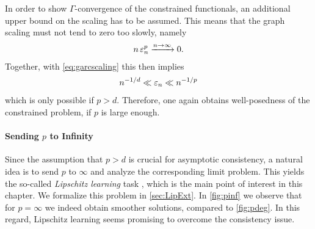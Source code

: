 %
%
In order to show $\Gamma$-convergence of the constrained functionals, an additional upper bound on the scaling has to be assumed. This means that the graph scaling must not tend to zero too slowly, namely
%
\begin{align*}
n\, \varepsilon_n^p \xrightarrow{n\to\infty} 0.	
\end{align*}
%
Together, with \cref{eq:garcscaling} this then implies
%
\begin{align*}
n^{-1/d} \ll \varepsilon_n \ll n^{-1/p}
\end{align*}
%
which is only possible if $p>d$. Therefore, one again obtains well-posedness of the constrained problem, if $p$ is large enough.


\paragraph{Sending $p$ to Infinity} 

Since the assumption that $p>d$ is crucial for asymptotic consistency, a natural idea is to send $p$ to $\infty$ and analyze the corresponding limit problem. This yields the so-called \emph{Lipschitz learning} task \cite{von2004distance, kyng2015algorithms}, which is the main point of interest in this chapter. We formalize this problem in \cref{sec:LipExt}. In \cref{fig:pinf} we observe that for $p=\infty$ we indeed obtain smoother solutions, compared to \cref{fig:pdeg}. In this regard, Lipschitz learning seems promising to overcome the consistency issue.

